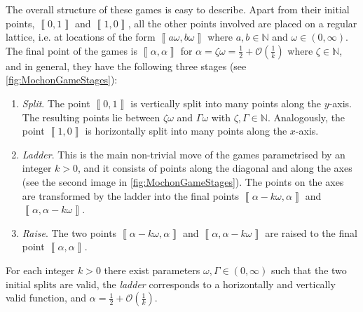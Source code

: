 \documentclass{theoretics}
\begin{document}
%
%
%
%
%
%
%
%
%
%
%
%
%
%
%
%
%
%
%
%
The overall structure of these games is easy to describe. Apart from their initial points, $\left\llbracket 0,1\right\rrbracket $
and $\left\llbracket 1,0\right\rrbracket $, all the other points involved are placed on a regular lattice, i.e. at locations of the form $\left\llbracket a\omega,b\omega\right\rrbracket $
where $a,b\in\mathbb{N}$ and $\omega\in (0,\infty)$. The final point of the games is $\left\llbracket \alpha,\alpha\right\rrbracket $
for $\alpha=\zeta\omega=\frac{1}{2}+\mathcal{O}\left(\frac{1}{k}\right)$
where $\zeta\in\mathbb{N}$, and in general, they have the following three stages (see
 \cref{fig:MochonGameStages}):
\begin{enumerate}
  \item \emph{Split}. The point $\left\llbracket 0,1\right\rrbracket $ is
        vertically split into many points along the $y$-axis. The resulting
        points lie between $\zeta\omega$ and $\Gamma\omega$ with $\zeta,\Gamma\in \mathbb{N}$. Analogously, the point $\left\llbracket 1,0\right\rrbracket $
        is horizontally split into many points along the $x$-axis.
  \item \emph{Ladder}. This is the main non-trivial move of the games parametrised by an integer $k>0$, and it consists of points along the diagonal
        and along the axes (see the second image in  \cref{fig:MochonGameStages}). The points on the axes are transformed by the
        ladder into the final points $\left\llbracket \alpha-k\omega,\alpha\right\rrbracket $
        and $\left\llbracket \alpha,\alpha-k\omega\right\rrbracket $.
  \item \emph{Raise}. The two points $\left\llbracket \alpha-k\omega,\alpha\right\rrbracket $
        and $\left\llbracket \alpha,\alpha-k\omega\right\rrbracket $ are
        raised to the final point $\left\llbracket \alpha,\alpha\right\rrbracket $.
\end{enumerate}
For each integer $k>0$ there exist parameters
$\omega,\Gamma\in (0,\infty)$ such that
the two initial splits are valid,  the \emph{ladder}
corresponds to a horizontally and vertically valid function,
and $\alpha=\frac{1}{2}+\mathcal{O}\left(\frac{1}{k}\right)$. %
\end{document}
